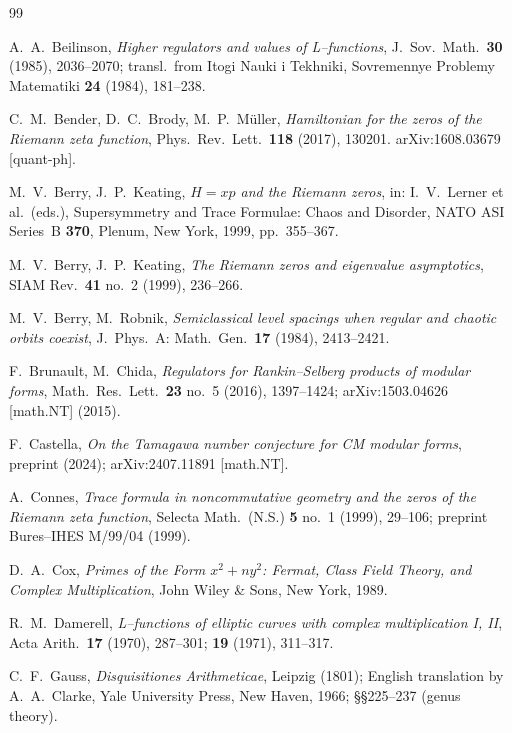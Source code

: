\documentclass[11pt]{amsart}
\theoremstyle{definition}
\theoremstyle{remark}
\begin{document}
\begin{thebibliography}{99}

A.~A.\ Beilinson,
\textit{Higher regulators and values of L--functions},
J.\ Sov.\ Math.\ \textbf{30} (1985), 2036--2070; transl.\ from
Itogi Nauki i Tekhniki, Sovremennye Problemy Matematiki
\textbf{24} (1984), 181--238.

C.~M.\ Bender, D.~C.\ Brody, M.~P.\ M\"uller,
\textit{Hamiltonian for the zeros of the Riemann zeta function},
Phys.\ Rev.\ Lett.\ \textbf{118} (2017), 130201.
arXiv:1608.03679 [quant-ph].

M.~V.\ Berry, J.~P.\ Keating,
\textit{\(H = xp\) and the Riemann zeros},
in: I.~V.\ Lerner et al.\ (eds.), Supersymmetry and Trace Formulae:
Chaos and Disorder, NATO ASI Series~B \textbf{370}, Plenum, New York,
1999, pp.~355--367.

M.~V.\ Berry, J.~P.\ Keating,
\textit{The Riemann zeros and eigenvalue asymptotics},
SIAM Rev.\ \textbf{41} no.~2 (1999), 236--266.

M.~V.\ Berry, M.\ Robnik,
\textit{Semiclassical level spacings when regular and chaotic orbits
coexist},
J.\ Phys.\ A: Math.\ Gen.\ \textbf{17} (1984), 2413--2421.

F.\ Brunault, M.\ Chida,
\textit{Regulators for Rankin--Selberg products of modular forms},
Math.\ Res.\ Lett.\ \textbf{23} no.~5 (2016), 1397--1424;
arXiv:1503.04626 [math.NT] (2015).

F.\ Castella,
\textit{On the Tamagawa number conjecture for CM modular forms},
preprint (2024); arXiv:2407.11891 [math.NT].

A.\ Connes,
\textit{Trace formula in noncommutative geometry and the zeros of the
Riemann zeta function},
Selecta Math.\ (N.S.) \textbf{5} no.~1 (1999), 29--106;
preprint Bures--IHES M/99/04 (1999).

D.~A.\ Cox,
\textit{Primes of the Form \(x^2 + ny^2\): Fermat, Class Field Theory,
and Complex Multiplication},
John Wiley \& Sons, New York, 1989.

R.~M.\ Damerell,
\textit{L--functions of elliptic curves with complex multiplication
I, II},
Acta Arith.\ \textbf{17} (1970), 287--301; \textbf{19} (1971), 311--317.

C.~F.\ Gauss,
\textit{Disquisitiones Arithmeticae},
Leipzig (1801); English translation by A.~A.\ Clarke, Yale University
Press, New Haven, 1966; §§225--237 (genus theory).


\end{thebibliography}
\end{document}
